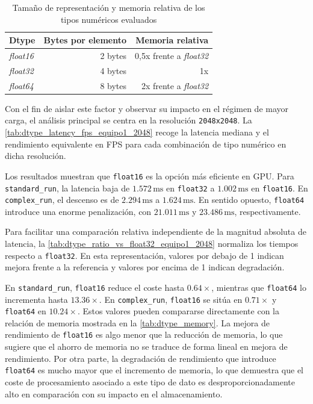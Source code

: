 \begin{table}[h]
	\centering
	\renewcommand{\arraystretch}{1.2}
	\setlength{\tabcolsep}{7pt}
	\begin{tabular}{|l|r|r|}
		\hline
		\rowcolor[gray]{0.90}
		\textbf{Dtype} & \textbf{Bytes por elemento} & \textbf{Memoria relativa} \\
		\hline
		\textit{float16} & 2 bytes & 0,5x frente a \textit{float32} \\
		\hline
		\textit{float32} & 4 bytes & 1x \\
		\hline
		\textit{float64} & 8 bytes & 2x frente a \textit{float32} \\
		\hline
	\end{tabular}
\caption{Tamaño de representación y memoria relativa de los tipos numéricos evaluados}
\label{tab:dtype_memory}
\end{table}


Con el fin de aislar este factor y observar su impacto en el régimen de mayor carga,
el análisis principal se centra en la resolución \texttt{2048x2048}. La
\autoref{tab:dtype_latency_fps_equipo1_2048} recoge la latencia mediana y el
rendimiento equivalente en FPS para cada combinación de tipo numérico en dicha resolución.



Los resultados muestran que \texttt{float16} es la opción más eficiente en GPU. Para
\texttt{standard\_run}, la latencia baja de \(1.572\,\mathrm{ms}\) en \texttt{float32} a
\(1.002\,\mathrm{ms}\) en \texttt{float16}. En \texttt{complex\_run}, el descenso es de
\(2.294\,\mathrm{ms}\) a \(1.624\,\mathrm{ms}\). En sentido opuesto,
\texttt{float64} introduce una enorme penalización, con \(21.011\,\mathrm{ms}\) y
\(23.486\,\mathrm{ms}\), respectivamente.

\newpage

Para facilitar una comparación relativa independiente de la magnitud absoluta de
latencia, la \autoref{tab:dtype_ratio_vs_float32_equipo1_2048} normaliza los tiempos
respecto a \texttt{float32}. En esta representación, valores por debajo de 1 indican
mejora frente a la referencia y valores por encima de 1 indican degradación.



En \texttt{standard\_run}, \texttt{float16} reduce el coste hasta
\(0.64\times\), mientras que \texttt{float64} lo incrementa hasta \(13.36\times\). En
\texttt{complex\_run}, \texttt{float16} se sitúa en \(0.71\times\) y \texttt{float64} en
\(10.24\times\). Estos valores pueden compararse directamente con la relación de memoria mostrada 
en la \autoref{tab:dtype_memory}. La mejora de rendimiento de \texttt{float16} es algo menor que 
la reducción de memoria, lo que sugiere que el ahorro de memoria no se traduce de forma lineal en 
mejora de rendimiento. Por otra parte, la degradación de rendimiento que introduce \texttt{float64}
es mucho mayor que el incremento de memoria, lo que demuestra que el coste de procesamiento asociado
a este tipo de dato es desproporcionadamente alto en comparación con su impacto en el almacenamiento.

